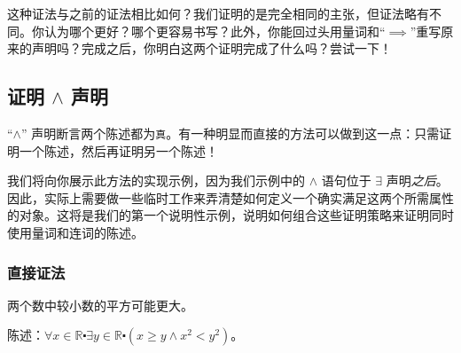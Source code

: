 这种证法与之前的证法相比如何？我们证明的是完全相同的主张，但证法略有不同。你认为哪个更好？哪个更容易书写？此外，你能回过头用量词和``$\implies$''重写原来的声明吗？完成之后，你明白这两个证明完成了什么吗？尝试一下！

\subsection{证明 $\land$ 声明}\label{sec:section4.9.4}

``$\land$'' 声明断言两个陈述都为\verb|真|。有一种明显而直接的方法可以做到这一点：只需证明一个陈述，然后再证明另一个陈述！

我们将向你展示此方法的实现示例，因为我们示例中的 $\land$ 语句位于 $\exists$ 声明\emph{之后}。因此，实际上需要做一些临时工作来弄清楚如何定义一个确实满足这两个所需属性的对象。这将是我们的第一个说明性示例，说明如何组合这些证明策略来证明同时使用量词和连词的陈述。

\subsubsection*{直接证法}

\begin{center}
    \noindent {}
\end{center}

\begin{example}
    两个数中较小数的平方可能更大。
    \begin{center}
        陈述：$ \forall x \in \mathbb{R} \centerdot \exists y \in \mathbb{R} \centerdot (x \ge y \land x^2 < y^2)$。
    \end{center}
\end{example}

\begin{center}
    \noindent {}
\end{center}

